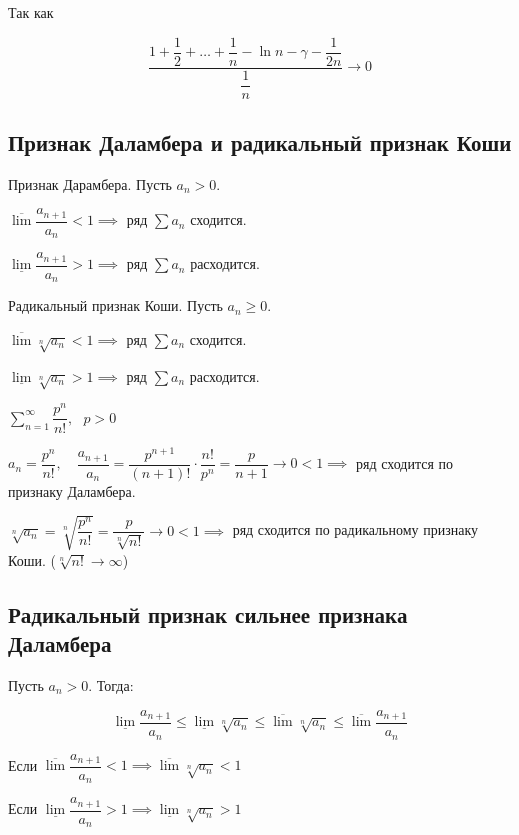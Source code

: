 Так как 

$$ \dfrac{1 + \dfrac{1}{2} + \dots + \dfrac{1}{n} - \ln n - \gamma - \dfrac{1}{2n}}{\dfrac{1}{n}} \to 0 $$

\subsection{Признак Даламбера и радикальный признак Коши}

\begin{theorem}
Признак Дарамбера. Пусть $a_n > 0$.

$\overline{\lim} \dfrac{a_{n+1}}{a_n} < 1 \implies $ ряд $\sum a_n$ сходится.

$\underline{\lim} \dfrac{a_{n+1}}{a_n} > 1 \implies $ ряд $\sum a_n$ расходится.
\end{theorem}

\begin{theorem}
Радикальный признак Коши. Пусть $a_n \geq 0$.

 $\overline{\lim} \sqrt[n]{a_n} < 1 \implies$ ряд $\sum a_n$ сходится.
 
  $\underline{\lim} \sqrt[n]{a_n} > 1 \implies$ ряд $\sum a_n$ расходится.
\end{theorem}

\begin{example}
$\sum_{n=1}^{\infty} \dfrac{p^{n}}{n!}, \ \ \ p > 0$

$a_n = \dfrac{p^n}{n!},\quad \dfrac{a_{n+1}}{a_n} = \dfrac{p^{n+1}}{(n+1)!} \cdot \dfrac{n!}{p^n} = \dfrac{p}{n + 1} \to 0 < 1 \implies $ ряд сходится по признаку Даламбера.

$\sqrt[n]{a_n} = \sqrt[n]{\dfrac{p^n}{n!}} = \dfrac{p}{\sqrt[n]{n!}} \to 0 < 1 \implies$ ряд сходится по радикальному признаку Коши. ($ \sqrt[n]{n!} \to \infty$)
\end{example}

\subsection{Радикальный признак сильнее признака Даламбера}

Пусть $a_n > 0$. Тогда:

$$ \underline{\lim} \dfrac{a_{n+1}}{a_n} \leq \underline{\lim}{\sqrt[n]{a_n}} \leq \overline{\lim}{\sqrt[n]{a_n}} \leq \overline{\lim}\dfrac{a_{n+1}}{a_n}$$

Если $\overline{\lim}\dfrac{a_{n+1}}{a_n} < 1 \implies \overline{\lim}{\sqrt[n]{a_n}} < 1$

Если $\underline{\lim}\dfrac{a_{n+1}}{a_n} > 1 \implies \underline{\lim} \sqrt[n]{a_n} > 1$

